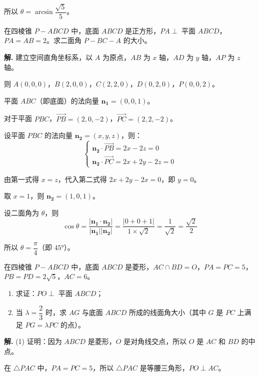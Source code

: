 \documentclass[11pt]{ctexrep}
\begin{document}
所以 $\theta = \arcsin\dfrac{\sqrt{5}}{5}$。

\begin{example}[求二面角]
    在四棱锥 $P-ABCD$ 中，底面 $ABCD$ 是正方形，$PA \perp$ 平面 $ABCD$，$PA = AB = 2$。求二面角 $P-BC-A$ 的大小。
\end{example}

\textbf{解.} 建立空间直角坐标系，以 $A$ 为原点，$AB$ 为 $x$ 轴，$AD$ 为 $y$ 轴，$AP$ 为 $z$ 轴。

则 $A(0, 0, 0)$，$B(2, 0, 0)$，$C(2, 2, 0)$，$D(0, 2, 0)$，$P(0, 0, 2)$。

平面 $ABC$（即底面）的法向量 $\boldsymbol{n_1} = (0, 0, 1)$。

对于平面 $PBC$，$\overrightarrow{PB} = (2, 0, -2)$，$\overrightarrow{PC} = (2, 2, -2)$。

设平面 $PBC$ 的法向量 $\boldsymbol{n_2} = (x, y, z)$，则：
\[
\begin{cases}
\boldsymbol{n_2} \cdot \overrightarrow{PB} = 2x - 2z = 0 \\
\boldsymbol{n_2} \cdot \overrightarrow{PC} = 2x + 2y - 2z = 0
\end{cases}
\]

由第一式得 $x = z$，代入第二式得 $2x + 2y - 2x = 0$，即 $y = 0$。

取 $x = 1$，则 $\boldsymbol{n_2} = (1, 0, 1)$。

设二面角为 $\theta$，则
\[
\cos\theta = \dfrac{|\boldsymbol{n_1} \cdot \boldsymbol{n_2}|}{|\boldsymbol{n_1}||\boldsymbol{n_2}|} = \dfrac{|0 + 0 + 1|}{1 \times \sqrt{2}} = \dfrac{1}{\sqrt{2}} = \dfrac{\sqrt{2}}{2}
\]

所以 $\theta = \dfrac{\pi}{4}$（即 $45°$）。

\begin{realexam}[2025 上海奉贤二模]
    在四棱锥 $P-ABCD$ 中，底面 $ABCD$ 是菱形，$AC \cap BD = O$，$PA = PC = 5$，$PB = PD = 2\sqrt{5}$，$AC = 6$。
    \begin{enumerate}
        \item 求证：$PO \perp$ 平面 $ABCD$；
        \item 当 $\lambda = \dfrac{2}{3}$ 时，求 $AG$ 与底面 $ABCD$ 所成的线面角大小（其中 $G$ 是 $PC$ 上满足 $PG = \lambda PC$ 的点）。
    \end{enumerate}
\end{realexam}

\textbf{解.} (1) 证明：因为 $ABCD$ 是菱形，$O$ 是对角线交点，所以 $O$ 是 $AC$ 和 $BD$ 的中点。

在 $\triangle PAC$ 中，$PA = PC = 5$，所以 $\triangle PAC$ 是等腰三角形，$PO \perp AC$。
\end{document}
